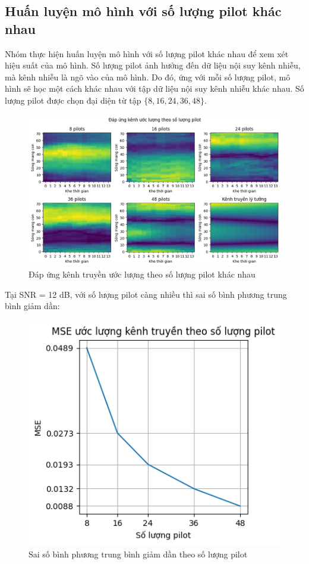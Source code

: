 \subsection*{Huấn luyện mô hình với số lượng pilot khác nhau}

Nhóm thực hiện huấn luyện mô hình với số lượng pilot khác nhau để xem xét hiệu suất của mô hình. 
Số lượng pilot ảnh hưởng đến dữ liệu nội suy kênh nhiễu, mà kênh nhiễu là ngõ vào của mô hình. 
Do đó, ứng với mỗi số lượng pilot, mô hình sẽ học một cách khác nhau với tập dữ liệu nội suy kênh nhiễu khác nhau.
Số lượng pilot được chọn đại diện từ tập $\{8, 16, 24, 36, 48\}$.

\begin{figure}[H]
    \centering
    \includegraphics[width=\textwidth]{../images/channel_estimation_vs_num_pilots.png}
    \caption{Đáp ứng kênh truyền ước lượng theo số lượng pilot khác nhau}
\end{figure}

Tại SNR = 12 dB, với số lượng pilot càng nhiều thì sai số bình phương trung bình giảm dần:

\begin{figure}[H]
    \centering
    \includegraphics[width=.5\textwidth]{../images/mse_vs_num_pilots.png}
    \caption{Sai số bình phương trung bình giảm dần theo số lượng pilot}
\end{figure}
